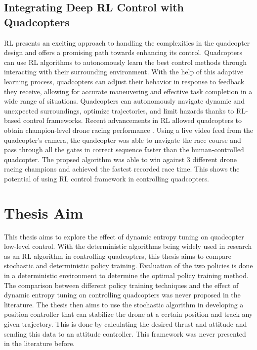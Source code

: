     \subsection{Integrating Deep RL Control with Quadcopters}
    RL presents an exciting approach to handling the complexities in the quadcopter design and offers a promising path towards enhancing its control. Quadcopters can use RL algorithms to autonomously learn the best control methods through interacting with their surrounding environment. With the help of this adaptive learning process, quadcopters can adjust their behavior in response to feedback they receive, allowing for accurate maneuvering and effective task completion in a wide range of situations. Quadcopters can autonomously navigate dynamic and unexpected surroundings, optimize trajectories, and limit hazards thanks to RL-based control frameworks. Recent advancements in RL allowed quadcopters to obtain champion-level drone racing performance \cite{nature}. Using a live video feed from the quadcopter's camera, the quadcopter was able to navigate the race course and pass through all the gates in correct sequence faster than the human-controlled quadcopter. The propsed algorithm was able to win against 3 different drone racing champions and achieved the fastest recorded race time. This shows the potential of using RL control framework in controlling quadcopters.
    \section{Thesis Aim}
    This thesis aims to explore the effect of dynamic entropy tuning on quadcopter low-level control. With the deterministic algorithms being widely used in research as an RL algorithm in controlling quadcopters, this thesis aims to compare stochastic and deterministic policy training. Evaluation of the two policies is done in a deterministic environment to determine the optimal policy training method. The comparison between different policy training techniques and the effect of dynamic entropy tuning on controlling quadcopters was never proposed in the literature. The thesis then aims to use the stochastic algorithm in developing a position controller that can stabilize the drone at a certain position and track any given trajectory. This is done by calculating the desired thrust and attitude and sending this data to an attitude controller. This framework was never presented in the literature before. 

